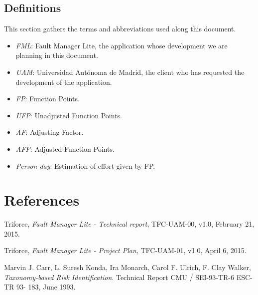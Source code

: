 \documentclass[11pt]{report}
\begin{document}
\section{Definitions}

This section gathers the terms and abbreviations used along this document.

\begin{itemize}
\item \emph{FML}: Fault Manager Lite, the application whose development we are planning in this document.

\item \emph{UAM}: Universidad Autónoma de Madrid, the client who has requested the development of the application.

\item \emph{FP}: Function Points.

\item \emph{UFP}: Unadjusted Function Points.

\item \emph{AF}: Adjusting Factor.

\item \emph{AFP}: Adjusted Function Points.

\item \emph{Person-day}: Estimation of effort given by FP.
\end{itemize}

\chapter{References}
\label{chapReferences}
\let\oldchapter\chapter
\renewcommand{\chapter}[2]{}
\begin{thebibliography}{9}
	Triforce,
	\emph{Fault Manager Lite - Technical report},
	TFC-UAM-00,
	v1.0,
	February 21, 2015.

	Triforce,
	\emph{Fault Manager Lite - Project Plan},
	TFC-UAM-01,
	v1.0,
	April 6, 2015.

	Marvin J. Carr, L. Suresh Konda, Ira Monarch, Carol F. Ulrich, F. Clay Walker,
	\emph{Taxonomy-based Risk Identification}.
	Technical Report CMU / SEI-93-TR-6 ESC-TR 93- 183,
	June 1993.

\end{thebibliography}
\let\chapter\oldchapter
\end{document}
